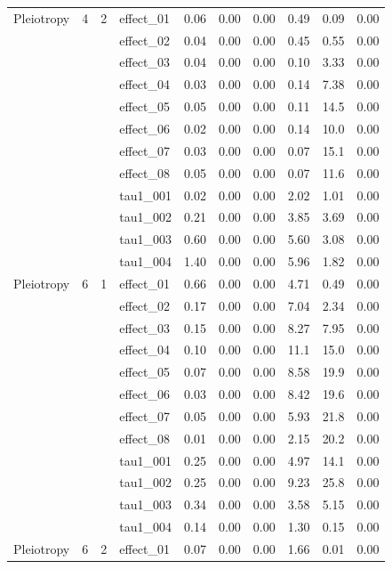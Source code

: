 {\begin{longtable}{lccl rr r r rr}
\midrule
Pleiotropy & 4 & 2 & effect\_01 & 0.06 & 0.00 & 0.00 & 0.49 & 0.09 & 0.00\\
 &  &  & effect\_02 & 0.04 & 0.00 & 0.00 & 0.45 & 0.55 & 0.00\\
 &  &  & effect\_03 & 0.04 & 0.00 & 0.00 & 0.10 & 3.33 & 0.00\\
 &  &  & effect\_04 & 0.03 & 0.00 & 0.00 & 0.14 & 7.38 & 0.00\\
 &  &  & effect\_05 & 0.05 & 0.00 & 0.00 & 0.11 & 14.5 & 0.00\\
 &  &  & effect\_06 & 0.02 & 0.00 & 0.00 & 0.14 & 10.0 & 0.00\\
 &  &  & effect\_07 & 0.03 & 0.00 & 0.00 & 0.07 & 15.1 & 0.00\\
 &  &  & effect\_08 & 0.05 & 0.00 & 0.00 & 0.07 & 11.6 & 0.00\\
 &  &  & tau1\_001 & 0.02 & 0.00 & 0.00 & 2.02 & 1.01 & 0.00\\
 &  &  & tau1\_002 & 0.21 & 0.00 & 0.00 & 3.85 & 3.69 & 0.00\\
 &  &  & tau1\_003 & 0.60 & 0.00 & 0.00 & 5.60 & 3.08 & 0.00\\
 &  &  & tau1\_004 & 1.40 & 0.00 & 0.00 & 5.96 & 1.82 & 0.00\\
\midrule
Pleiotropy & 6 & 1 & effect\_01 & 0.66 & 0.00 & 0.00 & 4.71 & 0.49 & 0.00\\
 &  &  & effect\_02 & 0.17 & 0.00 & 0.00 & 7.04 & 2.34 & 0.00\\
 &  &  & effect\_03 & 0.15 & 0.00 & 0.00 & 8.27 & 7.95 & 0.00\\
 &  &  & effect\_04 & 0.10 & 0.00 & 0.00 & 11.1 & 15.0 & 0.00\\
 &  &  & effect\_05 & 0.07 & 0.00 & 0.00 & 8.58 & 19.9 & 0.00\\
 &  &  & effect\_06 & 0.03 & 0.00 & 0.00 & 8.42 & 19.6 & 0.00\\
 &  &  & effect\_07 & 0.05 & 0.00 & 0.00 & 5.93 & 21.8 & 0.00\\
 &  &  & effect\_08 & 0.01 & 0.00 & 0.00 & 2.15 & 20.2 & 0.00\\
 &  &  & tau1\_001 & 0.25 & 0.00 & 0.00 & 4.97 & 14.1 & 0.00\\
 &  &  & tau1\_002 & 0.25 & 0.00 & 0.00 & 9.23 & 25.8 & 0.00\\
 &  &  & tau1\_003 & 0.34 & 0.00 & 0.00 & 3.58 & 5.15 & 0.00\\
 &  &  & tau1\_004 & 0.14 & 0.00 & 0.00 & 1.30 & 0.15 & 0.00\\
\midrule
Pleiotropy & 6 & 2 & effect\_01 & 0.07 & 0.00 & 0.00 & 1.66 & 0.01 & 0.00\\

\end{longtable}}
